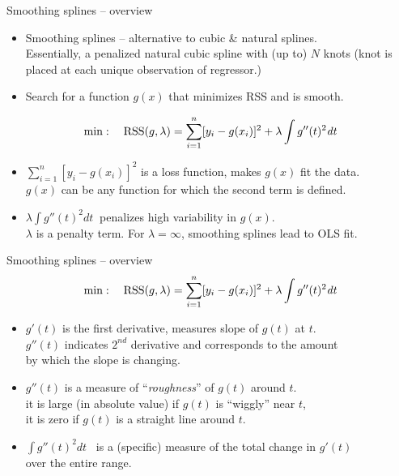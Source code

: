 \documentclass{beamer}
\begin{document}
\begin{frame}{Smoothing splines -- overview}
\begin{itemize}
    \item Smoothing splines -- alternative to cubic \& natural splines. \\Essentially, a penalized natural cubic spline with (up to) $N$ knots (knot is placed at each unique observation of regressor.)
    \bigskip
    \item Search for a function $g(x)$ that minimizes RSS and is smooth.
\end{itemize} \medskip
$$\min:~~~\textnormal{RSS}(g,\lambda) = \sum_{i=1}^n [y_i - g(x_i)]^2 + \lambda \int g''(t)^2 \textit{dt}$$
\begin{itemize}
    \item $\sum_{i=1}^n [y_i - g(x_i)]^2$ is a loss function, makes $g(x)$ fit the data.\\  \smallskip
    $g(x)$ can be any function for which the second term is defined.\\
    \bigskip
    \item $\lambda \int \! g''(t)^2 \textit{dt}~$ penalizes high variability in $g(x)$.\\  \smallskip
    $\lambda$ is a penalty term. For $\lambda=\infty$, smoothing splines lead to OLS fit.
\end{itemize}
\end{frame}
\begin{frame}{Smoothing splines -- overview}
$$\min:~~~\textnormal{RSS}(g,\lambda) = \sum_{i=1}^n [y_i - g(x_i)]^2 + \lambda \int g''(t)^2 \textit{dt}$$
\begin{itemize}
    \item $g'(t)$ is the first derivative, measures slope of $g(t)$ at $t$.\\
    \smallskip
    $g''(t)$ indicates $2^{nd}$ derivative and corresponds to the amount \\by which the slope is changing.
    \medskip
    \item $g''(t)$ is a measure of ``\textit{roughness}'' of $g(t)$ around $t$.\\
    \smallskip
    it is large (in absolute value) if $g(t)$ is ``wiggly'' near $t$,\\
    \smallskip
    it is zero if $g(t)$ is a straight line around $t$.
    \medskip
    \item $\int g''(t)^2 \textit{dt}$ ~is a (specific) measure of the total change in $g'(t)$ \\over the entire range. 
\end{itemize}
\end{frame}
\end{document}
